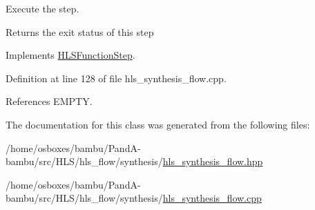 Execute the step. 

\begin{DoxyReturn}{Returns}
the exit status of this step 
\end{DoxyReturn}


Implements \hyperlink{classHLSFunctionStep_a8db4c00d080655984d98143206fc9fa8}{H\+L\+S\+Function\+Step}.



Definition at line 128 of file hls\+\_\+synthesis\+\_\+flow.\+cpp.



References E\+M\+P\+TY.



The documentation for this class was generated from the following files\+:\begin{DoxyCompactItemize}
\item 
/home/osboxes/bambu/\+Pand\+A-\/bambu/src/\+H\+L\+S/hls\+\_\+flow/synthesis/\hyperlink{hls__synthesis__flow_8hpp}{hls\+\_\+synthesis\+\_\+flow.\+hpp}\item 
/home/osboxes/bambu/\+Pand\+A-\/bambu/src/\+H\+L\+S/hls\+\_\+flow/synthesis/\hyperlink{hls__synthesis__flow_8cpp}{hls\+\_\+synthesis\+\_\+flow.\+cpp}\end{DoxyCompactItemize}
